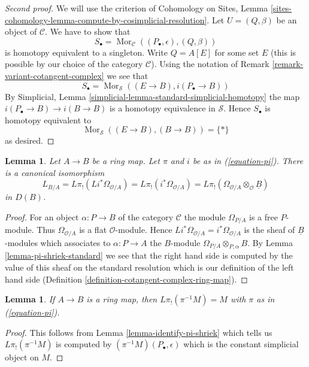 \documentclass{stacks-project}
\theoremstyle{plain}
\newtheorem{lemma}[subsection]{Lemma}
\theoremstyle{definition}
\theoremstyle{remark}
\numberwithin{equation}{subsection}
\def\Mor{\mathop{\mathrm{Mor}}\nolimits}
\begin{document}
\begin{proof}[Second proof]
We will use the criterion of Cohomology on Sites, Lemma
\ref{sites-cohomology-lemma-compute-by-cosimplicial-resolution}.
Let $U = (Q, \beta)$ be an object of $\mathcal{C}$.
We have to show that
$$
S_\bullet = \Mor_\mathcal{C}((P_\bullet, \epsilon), (Q, \beta))
$$
is homotopy equivalent to a singleton. Write $Q = A[E]$ for some set $E$
(this is possible by our choice of the category $\mathcal{C}$). Using the
notation of Remark \ref{remark-variant-cotangent-complex} we see that
$$
S_\bullet = \Mor_\mathcal{S}((E \to B), i(P_\bullet \to B))
$$
By Simplicial, Lemma \ref{simplicial-lemma-standard-simplicial-homotopy}
the map $i(P_\bullet \to B) \to i(B \to B)$ is a homotopy equivalence
in $\mathcal{S}$. Hence $S_\bullet$ is homotopy equivalent to
$$
\Mor_\mathcal{S}((E \to B), (B \to B)) = \{*\}
$$
as desired.
\end{proof}

\begin{lemma}
\label{lemma-compute-cotangent-complex}
Let $A \to B$ be a ring map.  Let $\pi$ and $i$ be as in (\ref{equation-pi}).
There is a canonical isomorphism
$$
L_{B/A} = L\pi_!(Li^*\Omega_{\mathcal{O}/A}) =
L\pi_!(i^*\Omega_{\mathcal{O}/A}) =
L\pi_!(\Omega_{\mathcal{O}/A} \otimes_\mathcal{O} \underline{B})
$$
in $D(B)$.
\end{lemma}

\begin{proof}
For an object $\alpha : P \to B$ of the category $\mathcal{C}$
the module $\Omega_{P/A}$ is a free $P$-module. Thus
$\Omega_{\mathcal{O}/A}$ is a flat $\mathcal{O}$-module. Hence
$Li^*\Omega_{\mathcal{O}/A} = i^*\Omega_{\mathcal{O}/A}$ is the sheaf
of $\underline{B}$-modules which associates to $\alpha : P \to A$ the
$B$-module $\Omega_{P/A} \otimes_{P, \alpha} B$.
By Lemma \ref{lemma-pi-shriek-standard}
we see that the right hand side is computed by
the value of this sheaf on the standard resolution which is our
definition of the left hand side
(Definition \ref{definition-cotangent-complex-ring-map}).
\end{proof}

\begin{lemma}
\label{lemma-pi-lower-shriek-constant-sheaf}
If $A \to B$ is a ring map, then $L\pi_!(\pi^{-1}M) = M$
with $\pi$ as in (\ref{equation-pi}).
\end{lemma}

\begin{proof}
This follows from Lemma \ref{lemma-identify-pi-shriek} which tells us
$L\pi_!(\pi^{-1}M)$ is computed by $(\pi^{-1}M)(P_\bullet, \epsilon)$
which is the constant simplicial object on $M$.
\end{proof}
\end{document}
